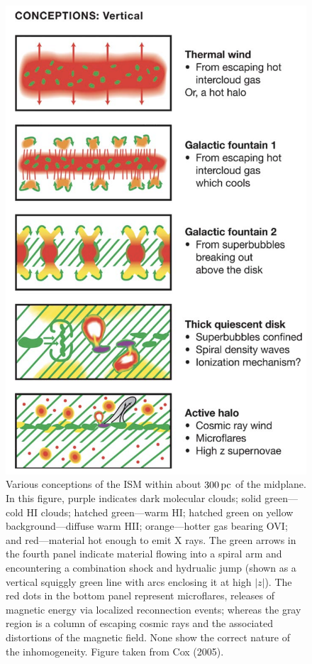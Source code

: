 \documentclass[a4paper,10pt]{article}
\begin{document}
\begin{figure}[t!]
    \centering
    \includegraphics[width=14cm]{figures/ISM_vertical.png}
    \caption{\footnotesize{Various conceptions of the ISM within about $300\,{\rm pc}$ of the midplane. In this figure, purple indicates dark molecular clouds; solid green—cold HI clouds; hatched green—warm HI; hatched green on yellow background—diffuse warm HII; orange—hotter gas bearing OVI; and red—material hot enough to emit X rays. The green arrows in the fourth panel indicate material flowing into a spiral arm and encountering a combination shock and hydrualic jump (shown as a vertical squiggly green line with arcs enclosing it at high $|z|$). The red dots in the bottom panel represent microflares, releases of magnetic energy via localized reconnection events; whereas the gray region is a column of escaping cosmic rays and the associated distortions of the magnetic field. None show the correct nature of the inhomogeneity. Figure taken from Cox (2005).}}
    \label{fig:ISMdisk}
\end{figure}
\end{document}
